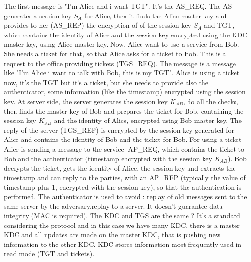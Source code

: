 \documentclass[11pt]{article}
\begin{document}
The first message is "I'm Alice and i want TGT". It's the AS\_REQ. The AS generates a session key $S_A$ for Alice, then it finds the Alice master key and provides to her (AS\_REP) the encryption of of the session key $S_A$ and TGT, which contains the identity of Alice and the session key encrypted using the KDC master key, using Alice master key. Now, Alice want to use a service from Bob. She needs a ticket for that, so that Alice asks for a ticket to Bob. This is a request to the office providing tickets (TGS\_REQ). The message is a message like "I'm Alice i want to talk with Bob, this is my TGT". Alice is using a ticket now, it's the TGT but it's a ticket, but she needs to provide also the authenticator, some information (like the timestamp) encrypted using the session key. At server side, the server generates the session key $K_{AB}$, do all the checks, then finds the master key of Bob and prepares the ticket for Bob, containing the session key $K_{AB}$ and the identity of Alice, encrypted using Bob master key. The reply of the server (TGS\_REP) is encrypted by the session key generated for Alice and contains the identity of Bob and the ticket for Bob. For using a ticket Alice is sending a message to the service, AP\_REQ, which contains the ticket to Bob and the authenticator (timestamp encrypted with the session key $K_{AB}$). Bob decrypts the ticket, gets the identity of Alice, the session key and extracts the timestamp and can reply to the parties, with an AP\_REP (typically the value of timestamp plus 1, encrypted with the session key), so that the authentication is performed. The authenticator is used to avoid : replay of old messages sent to the same server by the adversary,replay to a server. It doesn't guarantee data integrity (MAC is required). The KDC and TGS are the same ? It's a standard considering the protocol and in this case we have many KDC, there is a master KDC and all updates are made on the master KDC, that is pushing new information to the other KDC. KDC stores information most frequently used in read mode (TGT and tickets). 
\end{document}
